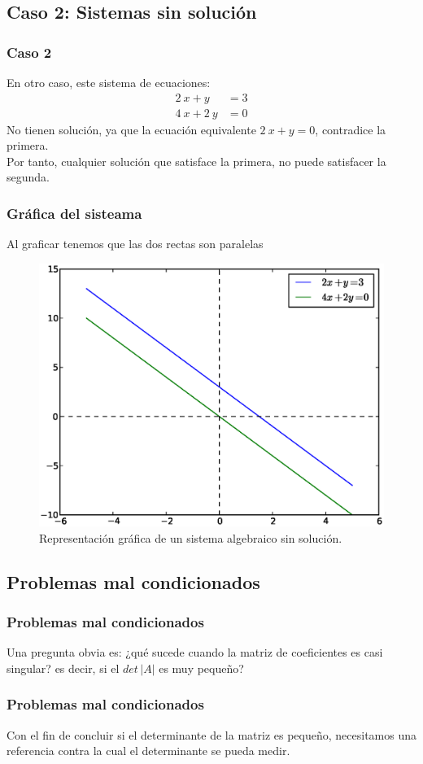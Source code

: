 \subsection*{Caso 2: Sistemas sin solución}
\begin{frame}
\frametitle{Caso 2}
En otro caso, este sistema de ecuaciones:
\begin{align*}
2 \: x + y &= 3 \\
4 \: x + 2 \:y &= 0
\end{align*}
No tienen solución, ya que la ecuación equivalente $2 \: x + y = 0$, contradice la primera.
\\
\bigskip
\pause
Por tanto, cualquier solución que satisface la primera, no puede satisfacer la segunda.
\end{frame}
\begin{frame}
\frametitle{Gráfica del sisteama}
Al graficar tenemos que las dos rectas son paralelas
\begin{figure}
	\centering
	\includegraphics[scale=0.3]{Imagenes/Grafica02.eps}
	\caption{Representación gráfica de un sistema algebraico sin solución.}
\end{figure}
\end{frame}
\subsection{Problemas mal condicionados}
\begin{frame}
\frametitle{Problemas mal condicionados}
Una pregunta obvia es: ¿qué sucede cuando la matriz de coeficientes es casi singular? es decir, si el $det \, \vert A \vert$ es muy pequeño?
\end{frame}
\begin{frame}
\frametitle{Problemas mal condicionados}
Con el fin de concluir si el determinante de la matriz es pequeño, necesitamos una referencia contra la cual el determinante se pueda medir.
\end{frame}
